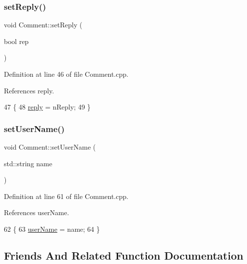 \subsubsection{\texorpdfstring{set\+Reply()}{setReply()}}
{\footnotesize\ttfamily void Comment\+::set\+Reply (\begin{DoxyParamCaption}\item[{bool}]{rep }\end{DoxyParamCaption})}



Definition at line 46 of file Comment.\+cpp.



References reply.


\begin{DoxyCode}
47 \{
48     \hyperlink{class_comment_a7b8ceeb67364d5e08299baeeff38ba03}{reply} = nReply;
49 \}
\end{DoxyCode}
\mbox{\label{class_comment_a9e47b4560fb5d4e8e9e254a23622c6d5}} 
\subsubsection{\texorpdfstring{set\+User\+Name()}{setUserName()}}
{\footnotesize\ttfamily void Comment\+::set\+User\+Name (\begin{DoxyParamCaption}\item[{std\+::string}]{name }\end{DoxyParamCaption})}



Definition at line 61 of file Comment.\+cpp.



References user\+Name.


\begin{DoxyCode}
62 \{
63     \hyperlink{class_comment_ad477f53e20e76aa9352926f93ccc7a56}{userName} = name;
64 \}
\end{DoxyCode}


\subsection{Friends And Related Function Documentation}
\mbox{\label{class_comment_ac5edd8dbab6e9d702dcdde889b96c250}} 
